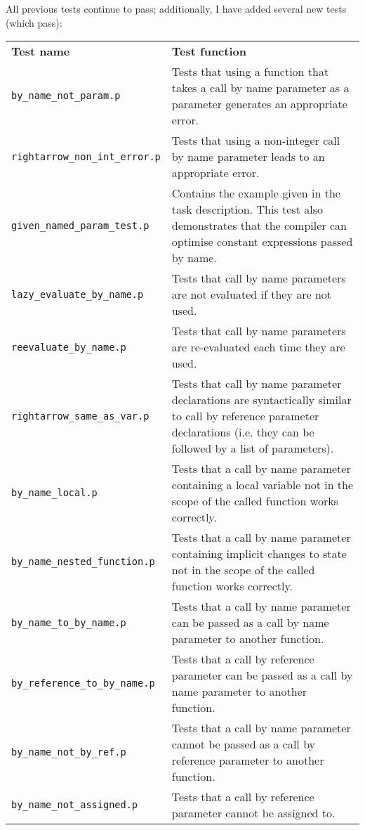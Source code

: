 \documentclass[a4paper,10pt]{article}
\begin{document}
All previous tests continue to pass; additionally, I have added several new tests (which pass): \\
\begin{tabularx}{\linewidth}{ |X|X| }
\hline
    \textbf{Test name} & \textbf{Test function} \\
\hhline{|=|=|}
    \texttt{by\_name\_not\_param.p} & Tests that using a function that takes a call by name parameter as a parameter generates an appropriate error. \\
\hline
    \texttt{rightarrow\_non\_int\_error.p} & Tests that using a non-integer call by name parameter leads to an appropriate error. \\
\hline
    \texttt{given\_named\_param\_test.p} & Contains the example given in the task description. This test also demonstrates that the compiler can optimise constant expressions passed by name. \\
\hline
    \texttt{lazy\_evaluate\_by\_name.p} & Tests that call by name parameters are not evaluated if they are not used. \\
\hline
    \texttt{reevaluate\_by\_name.p} & Tests that call by name parameters are re-evaluated each time they are used. \\
\hline
    \texttt{rightarrow\_same\_as\_var.p} & Tests that call by name parameter declarations are syntactically similar to call by reference parameter declarations (i.e. they can be followed by a list of parameters). \\
\hline
    \texttt{by\_name\_local.p} & Tests that a call by name parameter containing a local variable not in the scope of the called function works correctly. \\
\hline
    \texttt{by\_name\_nested\_function.p} & Tests that a call by name parameter containing implicit changes to state not in the scope of the called function works correctly. \\
\hline
    \texttt{by\_name\_to\_by\_name.p} & Tests that a call by name parameter can be passed as a call by name parameter to another function. \\
\hline
    \texttt{by\_reference\_to\_by\_name.p} & Tests that a call by reference parameter can be passed as a call by name parameter to another function. \\
\hline
    \texttt{by\_name\_not\_by\_ref.p} & Tests that a call by name parameter cannot be passed as a call by reference parameter to another function. \\
\hline
    \texttt{by\_name\_not\_assigned.p} & Tests that a call by reference parameter cannot be assigned to. \\

\end{tabularx}
\end{document}
